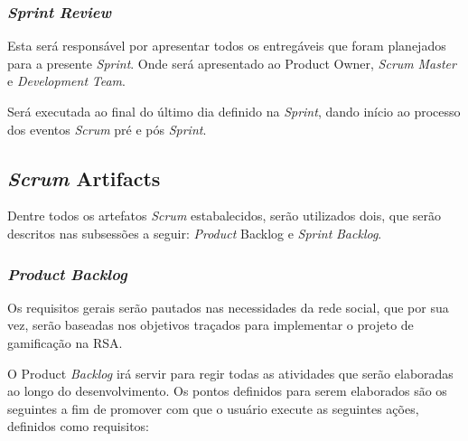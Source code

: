 \subsubsection{\textit{Sprint} \textit{Review}}
\label{subsec:sprintreview}
Esta será responsável por apresentar todos os entregáveis que foram planejados para a presente
\textit{Sprint}. Onde será apresentado ao Product Owner, \textit{Scrum} \textit{Master} e \textit{Development} \textit{Team}.

Será executada ao final do último dia definido na \textit{Sprint}, dando início ao processo dos eventos
\textit{Scrum} pré e pós \textit{Sprint}.

\subsection{\textit{Scrum} Artifacts}
\label{subsec:scrumartifacts}
Dentre todos os artefatos \textit{Scrum} estabalecidos, serão utilizados dois, que serão descritos nas
subsessões a seguir: \textit{Product} Backlog e \textit{Sprint} \textit{Backlog}.

\subsubsection{\textit{Product} \textit{Backlog}}
\label{subsec:productbacklog}
Os requisitos gerais serão pautados nas necessidades da rede social, que por sua vez, serão
baseadas nos objetivos traçados para implementar o projeto de gamificação na RSA. 

O Product \textit{Backlog} irá servir para regir todas as atividades que serão elaboradas ao longo do desenvolvimento. 
Os pontos definidos para serem elaborados são os seguintes a fim de promover
com que o usuário execute as seguintes ações, definidos como requisitos:

